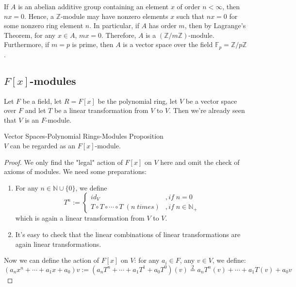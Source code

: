 \noindent If $A$ is an abelian additive group containing an element $x$ of order $n < \infty$, then $nx=0$. Hence, a $\mathbb{Z}$-module may have nonzero elements $x$ such that $nx =0$ for some nonzero ring element $n$. In particular, if $A$ has order $m$, then by Lagrange's Theorem, for any $x \in A$, $mx=0$. Therefore, $A$ is a $(\mathbb{Z}/m \mathbb{Z})$-module. Furthermore, if $m=p$ is prime, then $A$ is a vector space over the field $\mathbb{F}_p = \mathbb{Z}/p \mathbb{Z}$.

\subsection{$F[x]$-modules}

Let $F$ be a field, let $R=F[x]$ be the polynomial ring, let $V$ be a vector space over $F$ and let $T$ be a linear transformation from $V$ to $V$. Then we're already seen that $V$ is an $F$-module.

\begin{proposition}{Vector Spaces-Polynomial Rings-Modules Proposition}\\
$V$ can be regarded as an $F[x]$-module.
\end{proposition}


\begin{proof}
    We only find the "legal" action of $F[x]$ on $V$ here and omit the check of axioms of modules. We need some preparations:
    \begin{enumerate}
        \item For any $n \in \mathbb{N} \cup \{0\}$, we define
        $$T^n:= \begin{cases}
            id_V &,if \;n=0\\
            T \circ T \circ \cdots \circ T \;(n\;times) &,if \;n\in \mathbb{N}_+
        \end{cases}$$
        which is again a linear transformation from $V$ to $V$.

        \item It's easy to check that the linear combinations of linear transformations are again linear transformations.
    \end{enumerate}
    Now we can define the action of $F[x]$ on $V$: for any $a_i \in F$, any $v \in V$, we define:
    $$(a_n x^n + \cdots + a_1 x +a_0) v := (a_n T^n + \cdots + a_1 T^1 +a_0 T^0) (v) \overset{2}{=} a_n T^n (v) + \cdots + a_1 T(v) +a_0 v$$
\end{proof}

